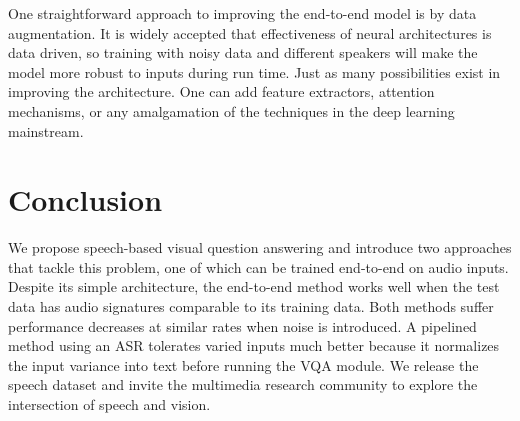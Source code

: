 \documentclass[letterpaper]{article} %
\begin{document}
One straightforward approach to improving the end-to-end model is by data augmentation. It is widely accepted that effectiveness of neural architectures is data driven, so training with noisy data and different speakers will make the model more robust to inputs during run time. Just as many possibilities exist in improving the architecture. One can add feature extractors, attention mechanisms, or any amalgamation of the techniques in the deep learning mainstream.

\section{Conclusion}

We propose speech-based visual question answering and introduce two approaches that tackle this problem, one of which can be trained end-to-end on audio inputs. Despite its simple architecture, the end-to-end method works well when the test data has audio signatures comparable to its training data. Both methods suffer performance decreases at similar rates when noise is introduced. A pipelined method using an ASR tolerates varied inputs much better because it normalizes the input variance into text before running the VQA module. We release the speech dataset and invite the multimedia research community to explore the intersection of speech and vision.


 
\end{document}
